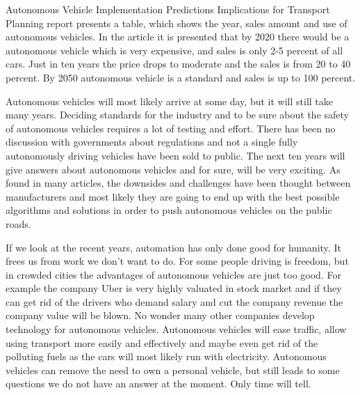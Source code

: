 \documentclass[english]{tktltiki}
\begin{document}
Autonomous Vehicle Implementation Predictions Implications for Transport 
Planning report presents a table, which shows the year, sales amount and use of 
autonomous vehicles. \cite{transportpolicy} In the article it is presented that 
by 2020 there would be a autonomous vehicle which is very expensive, and sales 
is only 2-5 percent of all cars. Just in ten years the price drops to moderate 
and the sales is from 20 to 40 percent. By 2050 autonomous vehicle is a standard 
and sales is up to 100 percent.

Autonomous vehicles will most likely arrive at some day, but it will still take 
many years. Deciding standards for the industry and to be sure about the safety 
of autonomous vehicles requires a lot of testing and effort. There has been no 
discussion with governments about regulations and not a single fully 
autonomously driving vehicles have been sold to public. The next ten years will 
give answers about autonomous vehicles and for sure, will be very exciting. As 
found in many articles, the downsides and challenges have been thought between 
manufacturers and most likely they are going to end up with the best possible 
algorithms and solutions in order to push autonomous vehicles on the public 
roads. 

If we look at the recent years, automation has only done good for humanity. It 
frees us from work we don't want to do. For some people driving is freedom, but 
in crowded cities the advantages of autonomous vehicles are just too good. For 
example the company Uber is very highly valuated in stock market and if they can 
get rid of the drivers who demand salary and cut the company revenue the company 
value will be blown. No wonder many other companies develop technology for 
autonomous vehicles. \cite{transportpolicy}  Autonomous vehicles will ease 
traffic, allow using transport more easily and effectively and maybe even get 
rid of the polluting fuels as the cars will most likely run with electricity. 
Autonomous vehicles can remove the need to own a personal vehicle, but still 
leads to some questions we do not have an answer at the moment. Only time will 
tell.


\nocite{*}



\lastpage

\appendices

\pagestyle{empty}
\end{document}
